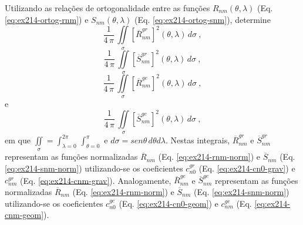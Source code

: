 \documentclass[10pt,a4paper,fleqn]{article}
\begin{document}
Utilizando as relaç\~{o}es de ortogonalidade entre as funç\~{o}es $R_{nm}(\theta, \lambda)$ 
(Eq. \ref{eq:ex214-ortog-rnm}) e $S_{nm}(\theta, \lambda)$ (Eq. \ref{eq:ex214-ortog-snm}),
determine 
$$\dfrac{1}{4 \, \pi} \, \iint \limits_{\sigma} \left[ \overline{R}_{nm}^{gr} \right]^{2}(\theta, 
\lambda) \, d \sigma \: ,$$ 
$$\dfrac{1}{4 \, \pi} \, \iint \limits_{\sigma} \left[ \overline{S}_{nm}^{gr} \right]^{2}(\theta, 
\lambda) \, d \sigma \: ,$$
$$\dfrac{1}{4 \, \pi} \, \iint \limits_{\sigma} \left[ \overline{R}_{nm}^{ge} \right]^{2}(\theta, 
\lambda) \, d \sigma \: ,$$
e
$$\dfrac{1}{4 \, \pi} \, \iint \limits_{\sigma} \left[ \overline{S}_{nm}^{ge} \right]^{2}(\theta, 
\lambda) \, d \sigma \: ,$$
em que $\iint \limits_{\sigma} = \int_{\lambda = 0}^{2\pi} \, \int_{\theta = 0}^{\pi}$ e $d \sigma 
= sen\theta \, d\theta d\lambda$. Nestas integrais, $\overline{R}_{nm}^{gr}$ e 
$\overline{S}_{nm}^{gr}$ representam as funç\~{o}es normalizadas $\overline{R}_{nm}$ 
(Eq. \ref{eq:ex214-rnm-norm}) e $\overline{S}_{nm}$ (Eq. \ref{eq:ex214-snm-norm}) utilizando-se
os coeficientes $c_{n0}^{gr}$ (Eq. \ref{eq:ex214-cn0-grav}) e $c_{nm}^{gr}$ 
(Eq. \ref{eq:ex214-cnm-grav}). Analogamente, $\overline{R}_{nm}^{ge}$ e $\overline{S}_{nm}^{ge}$ 
representam as funç\~{o}es normalizadas $\overline{R}_{nm}$ (Eq. \ref{eq:ex214-rnm-norm}) e 
$\overline{S}_{nm}$ (Eq. \ref{eq:ex214-snm-norm}) utilizando-se os coeficientes $c_{n0}^{ge}$ 
(Eq. \ref{eq:ex214-cn0-geom}) e $c_{nm}^{ge}$ (Eq. \ref{eq:ex214-cnm-geom}).

\begin{flushleft}
\dotfill
\end{flushleft}
\end{document}
